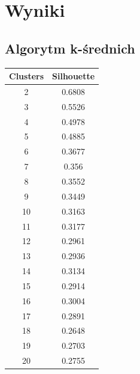 \documentclass{classrep}
\begin{document}
    \section{Wyniki}
    \label{results} {

        \subsection{Algorytm k-średnich}
        \label{result_1} {

            \begin{table}[!htbp]

                \begin{minipage}{.24\textwidth}
                    \centering
                    \begin{tabular}{|c|c|}
                        \hline
                        Clusters & Silhouette \\ \hline
                        2 & 0.6808 \\ \hline
                        3 & 0.5526 \\ \hline
                        4 & 0.4978 \\ \hline
                        5 & 0.4885 \\ \hline
                        6 & 0.3677 \\ \hline
                        7 & 0.356 \\ \hline
                        8 & 0.3552 \\ \hline
                        9 & 0.3449 \\ \hline
                        10 & 0.3163 \\ \hline
                        11 & 0.3177 \\ \hline
                        12 & 0.2961 \\ \hline
                        13 & 0.2936 \\ \hline
                        14 & 0.3134 \\ \hline
                        15 & 0.2914 \\ \hline
                        16 & 0.3004 \\ \hline
                        17 & 0.2891 \\ \hline
                        18 & 0.2648 \\ \hline
                        19 & 0.2703 \\ \hline
                        20 & 0.2755 \\ \hline

\end{tabular}
\end{minipage}
\end{table}}}
\end{document}
